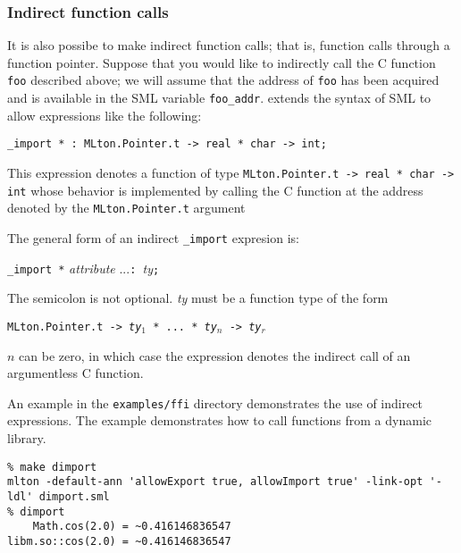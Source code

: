 \subsubsection{Indirect function calls}

It is also possibe to make indirect function calls; that is, function
calls through a function pointer.  Suppose that you would like to
indirectly call the C function {\tt foo} described above; we will
assume that the address of {\tt foo} has been acquired and is
available in the SML variable {\tt foo\_addr}.  {\mlton} extends the
syntax of SML to allow expressions like the following:
\begin{verbatim}
_import * : MLton.Pointer.t -> real * char -> int;
\end{verbatim}
This expression denotes a function of type {\tt MLton.Pointer.t -> real
* char -> int} whose behavior is implemented by calling the C function
at the address denoted by the {\tt MLton.Pointer.t} argument

The general form of an indirect \verb+_import+ expresion is:
\begin{center}
{\tt \_import *} {\it attribute} ...{\tt : }{\it ty}{\tt ;}
\end{center}
The semicolon is not optional. {\it ty} must be a function type of the form
\begin{center}
{\tt MLton.Pointer.t -> {\it ty}$_1$ * ... * {\it ty}$_n$ -> {\it ty}$_r$}
\end{center}
$n$ can be zero, in which case the expression denotes the indirect
call of an argumentless C function.

An example in the {\tt examples/ffi} directory demonstrates the use of
indirect {} expressions.  The example demonstrates how to call
functions from a dynamic library.

\begin{verbatim}
% make dimport
mlton -default-ann 'allowExport true, allowImport true' -link-opt '-ldl' dimport.sml
% dimport
    Math.cos(2.0) = ~0.416146836547
libm.so::cos(2.0) = ~0.416146836547
\end{verbatim}

